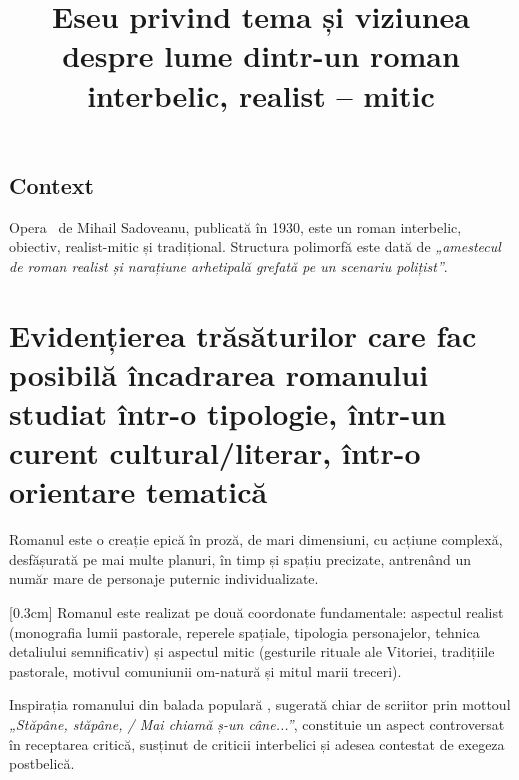 

\newcommand{\operatitle}{\textbfit{„Baltagul”}} %
\newcommand{\operaauthor}{Mihail Sadoveanu} %

\title{Eseu privind tema și viziunea despre lume dintr-un roman interbelic, realist -- mitic}



\maketitle %



\subsection{Context}

Opera \operatitle\ de \operaauthor, publicată în 1930, este un roman interbelic, obiectiv, realist-mitic și tradițional. Structura polimorfă este dată de \textit{„amestecul de roman realist și narațiune arhetipală grefată pe un scenariu polițist”}.


\section{Evidențierea trăsăturilor care fac posibilă încadrarea romanului studiat într-o tipologie, într-un curent cultural/literar, într-o orientare tematică}

Romanul este o creație epică în proză, de mari dimensiuni, cu acțiune complexă, desfășurată pe mai multe planuri, în timp și spațiu precizate, antrenând un număr mare de personaje puternic individualizate.

[0.3cm]
Romanul este realizat pe două coordonate fundamentale: aspectul realist (monografia lumii pastorale, reperele spațiale, tipologia personajelor, tehnica detaliului semnificativ) și aspectul mitic (gesturile rituale ale Vitoriei, tradițiile pastorale, motivul comuniunii om-natură și mitul marii treceri).

Inspirația romanului din balada populară , sugerată chiar de scriitor prin mottoul \textit{„Stăpâne, stăpâne, / Mai chiamă ș-un câne...”}, constituie un aspect controversat în receptarea critică, susținut de criticii interbelici și adesea contestat de exegeza postbelică.


